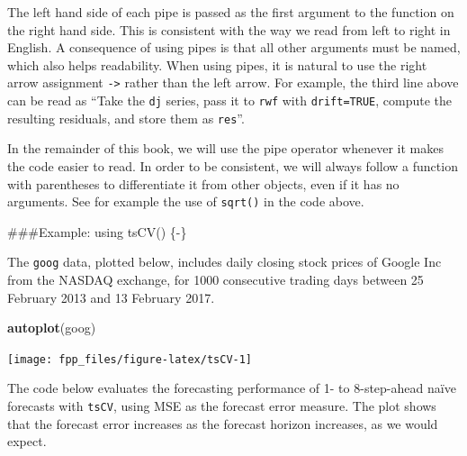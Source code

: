 \documentclass[]{book}
\newenvironment{Shaded}{\begin{snugshade}}{\end{snugshade}}
\newcommand{\CommentTok}[1]{\textcolor[rgb]{0.56,0.35,0.01}{\textit{#1}}}
\newcommand{\DataTypeTok}[1]{\textcolor[rgb]{0.13,0.29,0.53}{#1}}
\newcommand{\DecValTok}[1]{\textcolor[rgb]{0.00,0.00,0.81}{#1}}
\newcommand{\KeywordTok}[1]{\textcolor[rgb]{0.13,0.29,0.53}{\textbf{#1}}}
\newcommand{\NormalTok}[1]{#1}
\newcommand{\OperatorTok}[1]{\textcolor[rgb]{0.81,0.36,0.00}{\textbf{#1}}}
\newcommand{\StringTok}[1]{\textcolor[rgb]{0.31,0.60,0.02}{#1}}
\begin{document}
The left hand side of each pipe is passed as the first argument to the function on the right hand side. This is consistent with the way we read from left to right in English. A consequence of using pipes is that all other arguments must be named, which also helps readability. When using pipes, it is natural to use the right arrow assignment \texttt{-\textgreater{}} rather than the left arrow. For example, the third line above can be read as ``Take the \texttt{dj} series, pass it to \texttt{rwf} with \texttt{drift=TRUE}, compute the resulting residuals, and store them as \texttt{res}''.

In the remainder of this book, we will use the pipe operator whenever it makes the code easier to read. In order to be consistent, we will always follow a function with parentheses to differentiate it from other objects, even if it has no arguments. See for example the use of \texttt{sqrt()} in the code above.

\#\#\#Example: using tsCV() \{-\}

The \texttt{goog} data, plotted below, includes daily closing stock prices of Google Inc from the NASDAQ exchange, for 1000 consecutive trading days between 25 February 2013 and 13 February 2017.

\begin{Shaded}
\begin{Highlighting}[]
\KeywordTok{autoplot}\NormalTok{(goog)}
\end{Highlighting}
\end{Shaded}

\begin{center}\texttt{[image: fpp\_files/figure-latex/tsCV-1]} \end{center}

The code below evaluates the forecasting performance of 1- to 8-step-ahead naïve forecasts with \texttt{tsCV}, using MSE as the forecast error measure. The plot shows that the forecast error increases as the forecast horizon increases, as we would expect.

\begin{Shaded}
\end{Shaded}
\end{document}
